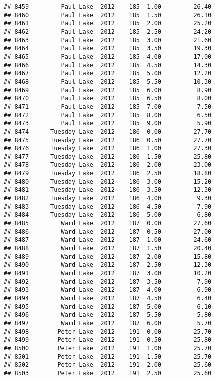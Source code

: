 \documentclass[
]{article}
\begin{document}
\begin{verbatim}
## 8459         Paul Lake  2012    185  1.00         26.40
## 8460         Paul Lake  2012    185  1.50         26.10
## 8461         Paul Lake  2012    185  2.00         25.20
## 8462         Paul Lake  2012    185  2.50         24.20
## 8463         Paul Lake  2012    185  3.00         21.60
## 8464         Paul Lake  2012    185  3.50         19.30
## 8465         Paul Lake  2012    185  4.00         17.00
## 8466         Paul Lake  2012    185  4.50         14.30
## 8467         Paul Lake  2012    185  5.00         12.20
## 8468         Paul Lake  2012    185  5.50         10.30
## 8469         Paul Lake  2012    185  6.00          8.90
## 8470         Paul Lake  2012    185  6.50          8.00
## 8471         Paul Lake  2012    185  7.00          7.50
## 8472         Paul Lake  2012    185  8.00          6.50
## 8473         Paul Lake  2012    185  9.00          5.90
## 8474      Tuesday Lake  2012    186  0.00         27.70
## 8475      Tuesday Lake  2012    186  0.50         27.70
## 8476      Tuesday Lake  2012    186  1.00         27.30
## 8477      Tuesday Lake  2012    186  1.50         25.80
## 8478      Tuesday Lake  2012    186  2.00         23.00
## 8479      Tuesday Lake  2012    186  2.50         18.80
## 8480      Tuesday Lake  2012    186  3.00         15.20
## 8481      Tuesday Lake  2012    186  3.50         12.30
## 8482      Tuesday Lake  2012    186  4.00          9.30
## 8483      Tuesday Lake  2012    186  4.50          7.90
## 8484      Tuesday Lake  2012    186  5.00          6.80
## 8485         Ward Lake  2012    187  0.00         27.60
## 8486         Ward Lake  2012    187  0.50         27.00
## 8487         Ward Lake  2012    187  1.00         24.60
## 8488         Ward Lake  2012    187  1.50         20.40
## 8489         Ward Lake  2012    187  2.00         15.80
## 8490         Ward Lake  2012    187  2.50         12.30
## 8491         Ward Lake  2012    187  3.00         10.20
## 8492         Ward Lake  2012    187  3.50          7.90
## 8493         Ward Lake  2012    187  4.00          6.90
## 8494         Ward Lake  2012    187  4.50          6.40
## 8495         Ward Lake  2012    187  5.00          6.10
## 8496         Ward Lake  2012    187  5.50          5.80
## 8497         Ward Lake  2012    187  6.00          5.70
## 8498        Peter Lake  2012    191  0.00         25.70
## 8499        Peter Lake  2012    191  0.50         25.80
## 8500        Peter Lake  2012    191  1.00         25.70
## 8501        Peter Lake  2012    191  1.50         25.70
## 8502        Peter Lake  2012    191  2.00         25.60
## 8503        Peter Lake  2012    191  2.50         25.60

\end{verbatim}
\end{document}
